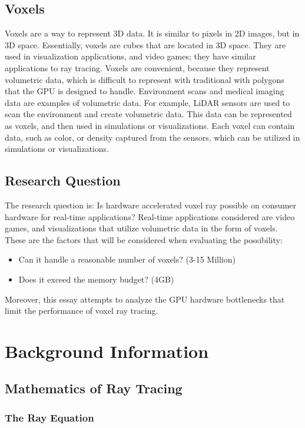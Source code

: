 \documentclass[12pt]{article}
\begin{document}
\subsection{Voxels}

Voxels are a way to represent 3D data. It is similar to pixels in 2D images,
but in 3D space. Essentially, voxels are cubes that are located in 3D space.
They are used in visualization applications, and video games; they have
similar applications to ray tracing. Voxels are convenient, because they represent
volumetric data, which is difficult to represent with traditional with polygons that the GPU is designed to handle.
Environment scans and medical imaging data are examples of volumetric data.
For example, LiDAR sensors are used to scan the environment and create volumetric data.
This data can be represented as voxels, and then used in simulations or visualizations.
Each voxel can contain data, such as color, or density captured from the sensors,
which can be utilized in simulations or visualizations.

\subsection{Research Question}

The research question is: Is hardware accelerated voxel ray possible on consumer hardware for real-time applications?
Real-time applications considered are video games, and visualizations that utilize volumetric data in the form of voxels.
These are the factors that will be considered when evaluating the possibility:
\begin{itemize}
    \itemsep0em
    \item Can it handle a reasonable number of voxels? (3-15 Million)
    \item Does it exceed the memory budget? (4GB)
\end{itemize}

Moreover, this essay attempts to analyze the GPU hardware bottlenecks that limit the performance of voxel ray tracing.

\section{Background Information}

\subsection{Mathematics of Ray Tracing}
\subsubsection{The Ray Equation}
\end{document}

